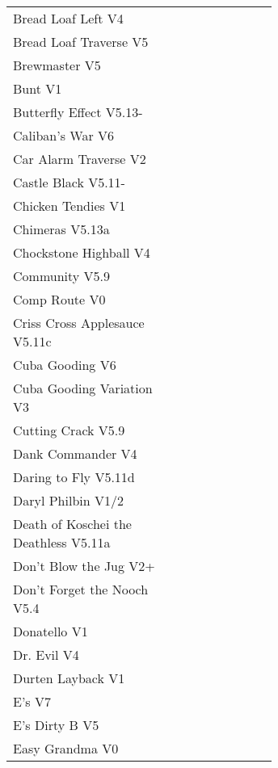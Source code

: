 \begin{flushleft}
\begin{center}
\begin{supertabular}{p{0.65\linewidth}r}
Bread Loaf Left V4 & \pageref{rt:Bread Loaf Left} \\
Bread Loaf Traverse V5 & \pageref{rt:Bread Loaf Traverse} \\
Brewmaster V5 & \pageref{rt:Brewmaster} \\
Bunt V1 & \pageref{rt:Bunt} \\
Butterfly Effect V5.13- & \pageref{rt:Butterfly Effect} \\
Caliban's War V6 & \pageref{rt:Caliban's War} \\
Car Alarm Traverse V2 & \pageref{rt:Car Alarm Traverse} \\
Castle Black V5.11- & \pageref{rt:Castle Black} \\
Chicken Tendies V1 & \pageref{rt:Chicken Tendies} \\
Chimeras V5.13a & \pageref{rt:Chimeras} \\
Chockstone Highball V4 & \pageref{rt:Chockstone Highball} \\
Community V5.9 & \pageref{rt:Community} \\
Comp Route V0 & \pageref{rt:Comp Route} \\
Criss Cross Applesauce V5.11c & \pageref{rt:Criss Cross Applesauce} \\
Cuba Gooding V6 & \pageref{rt:Cuba Gooding} \\
Cuba Gooding Variation V3 & \pageref{vr:Cuba Gooding Variation} \\
Cutting Crack V5.9 & \pageref{rt:Cutting Crack} \\
Dank Commander V4 & \pageref{rt:Dank Commander} \\
Daring to Fly V5.11d & \pageref{rt:Daring to Fly} \\
Daryl Philbin V1/2 & \pageref{rt:Daryl Philbin} \\
Death of Koschei the Deathless V5.11a & \pageref{rt:Death of Koschei the Deathless} \\
Don't Blow the Jug V2+ & \pageref{rt:Don't Blow the Jug} \\
Don't Forget the Nooch V5.4 & \pageref{rt:Don't Forget the Nooch} \\
Donatello V1 & \pageref{rt:Donatello} \\
Dr. Evil V4 & \pageref{rt:Dr. Evil} \\
Durten Layback V1 & \pageref{rt:Durten Layback} \\
E's V7 & \pageref{rt:E's} \\
E's Dirty B V5 & \pageref{rt:E's Dirty B} \\
Easy Grandma V0 & \pageref{rt:Easy Grandma} \\

\end{supertabular}
\end{center}
\end{flushleft}
